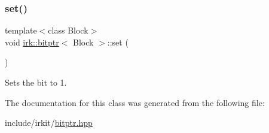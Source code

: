 \subsubsection{\texorpdfstring{set()}{set()}\hspace{0.1cm}{\footnotesize\ttfamily [2/2]}}
{\footnotesize\ttfamily template$<$class Block$>$ \\
void \mbox{\hyperlink{classirk_1_1bitptr}{irk\+::bitptr}}$<$ Block $>$\+::set (\begin{DoxyParamCaption}{ }\end{DoxyParamCaption})\hspace{0.3cm}{\ttfamily [inline]}}



Sets the bit to 1. 



The documentation for this class was generated from the following file\+:\begin{DoxyCompactItemize}
\item 
include/irkit/\mbox{\hyperlink{bitptr_8hpp}{bitptr.\+hpp}}\end{DoxyCompactItemize}
